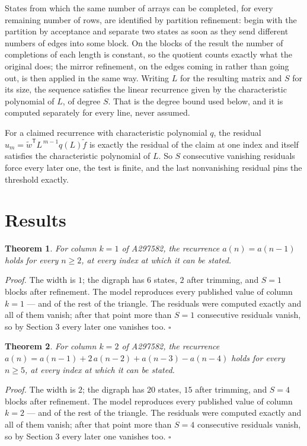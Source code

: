 \documentclass[11pt]{article}
\newtheorem{theorem}{Theorem}
\theoremstyle{definition}
\begin{document}
States from which the same number of arrays can be completed, for every remaining number of rows, are identified by partition refinement: begin with the partition by acceptance and separate two states as soon as they send different numbers of edges into some block. On the blocks of the result the number of completions of each length is constant, so the quotient counts exactly what the original does; the mirror refinement, on the edges coming in rather than going out, is then applied in the same way. Writing $L$ for the resulting matrix and $S$ for its size, the sequence satisfies the linear recurrence given by the characteristic polynomial of $L$, of degree $S$. That is the degree bound used below, and it is computed separately for every line, never assumed.

For a claimed recurrence with characteristic polynomial $q$, the residual $u_m = \tilde w^{\mathsf T}L^{\,m-1}q(L)\tilde f$ is exactly the residual of the claim at one index and itself satisfies the characteristic polynomial of $L$. So $S$ consecutive vanishing residuals force every later one, the test is finite, and the last nonvanishing residual pins the threshold exactly.

\section{Results}

\begin{theorem} For column $k = 1$ of A297582, the recurrence $a(n) = a(n-1)$ holds for every $n \ge 2$, at every index at which it can be stated.\end{theorem}

{\itshape Proof.} The width is $1$; the digraph has $6$ states, $2$ after trimming, and $S = 1$ blocks after refinement. The model reproduces every published value of column $k = 1$ --- and of the rest of the triangle. The residuals were computed exactly and all of them vanish; after that point more than $S = 1$ consecutive residuals vanish, so by Section 3 every later one vanishes too. $\square$

\begin{theorem} For column $k = 2$ of A297582, the recurrence $a(n) = a(n-1) + 2\,a(n-2) + a(n-3) - a(n-4)$ holds for every $n \ge 5$, at every index at which it can be stated.\end{theorem}

{\itshape Proof.} The width is $2$; the digraph has $20$ states, $15$ after trimming, and $S = 4$ blocks after refinement. The model reproduces every published value of column $k = 2$ --- and of the rest of the triangle. The residuals were computed exactly and all of them vanish; after that point more than $S = 4$ consecutive residuals vanish, so by Section 3 every later one vanishes too. $\square$
\end{document}

